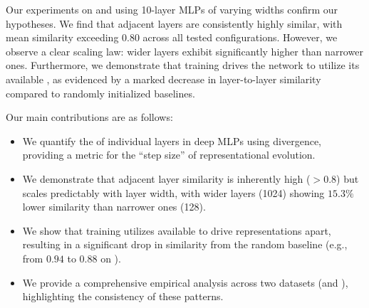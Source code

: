 Our experiments on \mnist and \cifar using 10-layer MLPs of varying widths confirm our hypotheses. We find that adjacent layers are consistently highly similar, with mean \cka similarity exceeding $0.80$ across all tested configurations. However, we observe a clear scaling law: wider layers exhibit significantly higher \repdiv than narrower ones. Furthermore, we demonstrate that training drives the network to utilize its available \transcap, as evidenced by a marked decrease in layer-to-layer similarity compared to randomly initialized baselines.

Our main contributions are as follows:
\begin{itemize}[leftmargin=*,itemsep=0pt,topsep=0pt]
    \item We quantify the \transcap of individual layers in deep MLPs using \cka divergence, providing a metric for the ``step size'' of representational evolution.
    \item We demonstrate that adjacent layer similarity is inherently high ($>0.8$) but scales predictably with layer width, with wider layers (1024) showing $15.3\%$ lower similarity than narrower ones (128).
    \item We show that training utilizes available \transcap to drive representations apart, resulting in a significant drop in similarity from the random baseline (e.g., from $0.94$ to $0.88$ on \mnist).
    \item We provide a comprehensive empirical analysis across two datasets (\mnist and \cifar), highlighting the consistency of these patterns.
\end{itemize}

